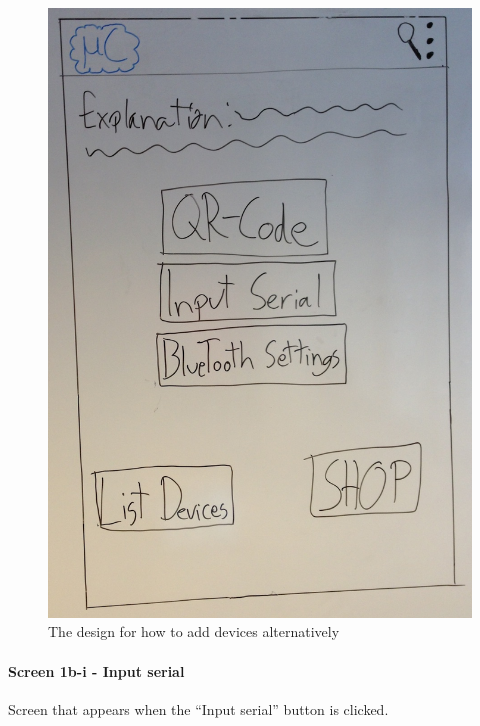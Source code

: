 \begin{figure}[H]
	\centering
		\includegraphics[scale=0.2]{images/Design_guide/Screen1b.png}
	\caption[Screen 1b - Add device manually]{The design for how to add devices alternatively}
	\label{fig:screen1b}
\end{figure}


\paragraph{Screen 1b-i - Input serial}
Screen that appears when the ``Input serial'' button is clicked.

